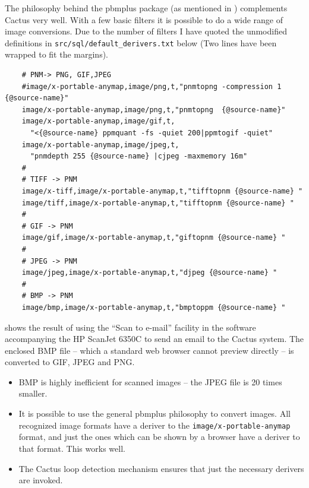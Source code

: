 
The philosophy behind the pbmplus package (as mentioned in
) complements Cactus very well.  With a
few basic filters it is possible to do a wide range of image
conversions.  Due to the number of filters I have quoted the
unmodified definitions in \texttt{src/sql/default_derivers.txt} below
(Two lines have been wrapped to fit the margins).

\begin{verbatim}
    # PNM-> PNG, GIF,JPEG
    #image/x-portable-anymap,image/png,t,"pnmtopng -compression 1 {@source-name}"
    image/x-portable-anymap,image/png,t,"pnmtopng  {@source-name}"
    image/x-portable-anymap,image/gif,t,
      "<{@source-name} ppmquant -fs -quiet 200|ppmtogif -quiet"
    image/x-portable-anymap,image/jpeg,t,
      "pnmdepth 255 {@source-name} |cjpeg -maxmemory 16m"
    #
    # TIFF -> PNM
    image/x-tiff,image/x-portable-anymap,t,"tifftopnm {@source-name} "
    image/tiff,image/x-portable-anymap,t,"tifftopnm {@source-name} "
    #
    # GIF -> PNM
    image/gif,image/x-portable-anymap,t,"giftopnm {@source-name} "
    #
    # JPEG -> PNM
    image/jpeg,image/x-portable-anymap,t,"djpeg {@source-name} "
    #
    # BMP -> PNM
    image/bmp,image/x-portable-anymap,t,"bmptoppm {@source-name} "
\end{verbatim}


 shows the result of using the ``Scan to
e-mail'' facility in the software accompanying the HP ScanJet 6350C to
send an email to the Cactus system.  The enclosed BMP file -- which a
standard web browser cannot preview directly -- is converted to GIF,
JPEG and PNG.


\begin{itemize}
\item BMP is highly inefficient for scanned images -- the JPEG file is 20
  times smaller.

\item It is possible to use the general pbmplus philosophy to convert
  images.  All recognized image formats have a deriver to the
  \texttt{image/x-portable-anymap} format, and just the ones which can be
  shown by a browser have a deriver to that format.   This works well.
\item The Cactus loop detection mechanism ensures that just the
  necessary derivers are invoked.
\end{itemize}

